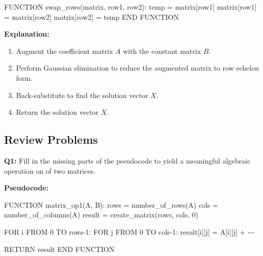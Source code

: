 \documentclass[
  letterpaper,
  DIV=11,
  numbers=noendperiod]{scrreprt}
\newenvironment{Shaded}{\begin{snugshade}}{\end{snugshade}}
\newcommand{\DecValTok}[1]{\textcolor[rgb]{0.68,0.00,0.00}{#1}}
\newcommand{\NormalTok}[1]{\textcolor[rgb]{0.00,0.23,0.31}{#1}}
\newcommand{\OperatorTok}[1]{\textcolor[rgb]{0.37,0.37,0.37}{#1}}
\providecommand{\tightlist}{%
  \setlength{\itemsep}{0pt}\setlength{\parskip}{0pt}}\usepackage{longtable,booktabs,array}
\theoremstyle{plain}
\theoremstyle{definition}
\theoremstyle{remark}
\begin{document}
\begin{Shaded}
\begin{Highlighting}[]
\NormalTok{FUNCTION swap\_rows(matrix, row1, row2):}
\NormalTok{    temp }\OperatorTok{=}\NormalTok{ matrix[row1]}
\NormalTok{    matrix[row1] }\OperatorTok{=}\NormalTok{ matrix[row2]}
\NormalTok{    matrix[row2] }\OperatorTok{=}\NormalTok{ temp}
\NormalTok{END FUNCTION}
\end{Highlighting}
\end{Shaded}

\textbf{Explanation:}

\begin{enumerate}
\def\labelenumi{\arabic{enumi}.}
\tightlist
\item
  Augment the coefficient matrix \(A\) with the constant matrix \(B\).
\item
  Perform Gaussian elimination to reduce the augmented matrix to row
  echelon form.
\item
  Back-substitute to find the solution vector \(X\).
\item
  Return the solution vector \(X\).
\end{enumerate}

\subsection{Review Problems}\label{review-problems}

\textbf{Q1:} Fill in the missing parts of the pseudocode to yield a
meaningful algebraic operation on of two matrices.

\textbf{Pseudocode:}

\begin{Shaded}
\begin{Highlighting}[]
\NormalTok{FUNCTION matrix\_op1(A, B):}
\NormalTok{    rows }\OperatorTok{=}\NormalTok{ number\_of\_rows(A)}
\NormalTok{    cols }\OperatorTok{=}\NormalTok{ number\_of\_columns(A)}
\NormalTok{    result }\OperatorTok{=}\NormalTok{ create\_matrix(rows, cols, }\DecValTok{0}\NormalTok{)}
    
\NormalTok{    FOR i FROM }\DecValTok{0}\NormalTok{ TO rows}\OperatorTok{{-}}\DecValTok{1}\NormalTok{:}
\NormalTok{        FOR j FROM }\DecValTok{0}\NormalTok{ TO cols}\OperatorTok{{-}}\DecValTok{1}\NormalTok{:}
\NormalTok{            result[i][j] }\OperatorTok{=}\NormalTok{ A[i][j] }\OperatorTok{+} \OperatorTok{{-}{-}{-}}
    
\NormalTok{    RETURN result}
\NormalTok{END FUNCTION}
\end{Highlighting}
\end{Shaded}
\end{document}
